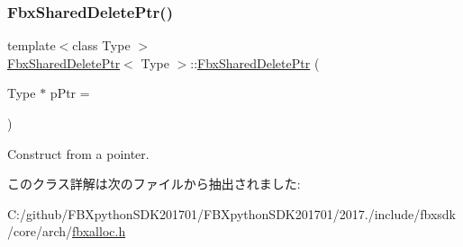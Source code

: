 \subsubsection{\texorpdfstring{Fbx\+Shared\+Delete\+Ptr()}{FbxSharedDeletePtr()}}
{\footnotesize\ttfamily template$<$class Type $>$ \\
\hyperlink{class_fbx_shared_delete_ptr}{Fbx\+Shared\+Delete\+Ptr}$<$ Type $>$\+::\hyperlink{class_fbx_shared_delete_ptr}{Fbx\+Shared\+Delete\+Ptr} (\begin{DoxyParamCaption}\item[{Type $\ast$}]{p\+Ptr = {} }\end{DoxyParamCaption})\hspace{0.3cm}{\ttfamily [explicit]}}



Construct from a pointer. 



このクラス詳解は次のファイルから抽出されました\+:\begin{DoxyCompactItemize}
\item 
C\+:/github/\+F\+B\+Xpython\+S\+D\+K201701/\+F\+B\+Xpython\+S\+D\+K201701/2017./include/fbxsdk/core/arch/\hyperlink{fbxalloc_8h}{fbxalloc.\+h}\end{DoxyCompactItemize}
